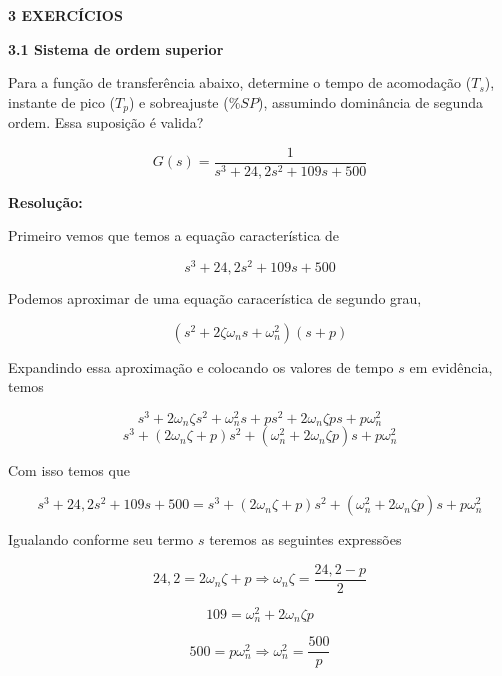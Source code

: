 
\begin{flushleft}
	 \textcolor{myBlue}{\textbf{\Large{3 EXERCÍCIOS }}}
\end{flushleft}

\begin{flushleft}
	 \textcolor{myBlue}{\textbf{\large{3.1 Sistema de ordem superior }}}
\end{flushleft}
Para a função de transferência abaixo, determine o tempo de acomodação (\(T_s\)), instante de pico (\(T_p\)) e sobreajuste (\(\% SP\)), assumindo dominância de segunda ordem. Essa suposição é valida?

$$ G(s)=\dfrac{1}{s^3+24,2s^2+109s+500} $$

\noindent \textbf{Resolução: }

Primeiro vemos que temos a equação característica de

\[ s^3 + 24,2s^2  + 109s + 500\] 

Podemos aproximar de uma equação caracerística de segundo grau,

\[ (s^2 + 2\zeta \omega_n s + \omega_n^2)(s+p)  \]

Expandindo essa aproximação e colocando os valores de tempo \(s\) em evidência, temos

\[ s^3 + 2 \omega_n \zeta s^2 + \omega_n^2 s +ps^2 +2 \omega_n \zeta p s + p\omega_n^2  \]
\[ s^3 + (2\omega_n \zeta + p)s^2 + (\omega_n^2 + 2\omega_n \zeta p)s + p\omega_n^2 \]

Com isso temos que

\[ s^3 + 24,2s^2  + 109s + 500 = s^3 + (2\omega_n \zeta + p)s^2 + (\omega_n^2 + 2\omega_n \zeta p)s + p\omega_n^2 \]

Igualando conforme seu termo \(s \) teremos as seguintes expressões

\begin{equation}
24,2 = 2\omega_n \zeta + p \Rightarrow \omega_n \zeta = \dfrac{24,2 - p}{2}
\end{equation}

\begin{equation}
109 = \omega_n^2 + 2\omega_n \zeta p
\end{equation}

\begin{equation}
 500 = p\omega_n^2 \Rightarrow \omega_n^2 = \dfrac{500}{p}
\end{equation}

